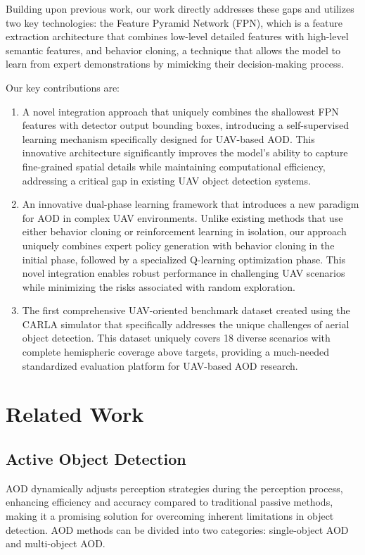 \documentclass[lettersize,journal]{IEEEtran}
\begin{document}
Building upon previous work, our work directly addresses these gaps and utilizes two key technologies: the Feature Pyramid Network (FPN), which is a feature extraction architecture that combines low-level detailed features with high-level semantic features, and behavior cloning, a technique that allows the model to learn from expert demonstrations by mimicking their decision-making process. 

Our key contributions are:
\begin{enumerate}
\item{A novel integration approach that uniquely combines the shallowest FPN features with detector output bounding boxes, introducing a self-supervised learning mechanism specifically designed for UAV-based AOD. This innovative architecture significantly improves the model's ability to capture fine-grained spatial details while maintaining computational efficiency, addressing a critical gap in existing UAV object detection systems.}
\item{An innovative dual-phase learning framework that introduces a new paradigm for AOD in complex UAV environments. Unlike existing methods that use either behavior cloning \cite{behavior2023} or reinforcement learning \cite{dataset2017, active2019,novel2021, active2022,enhancing2021,selfsupervised2022,dynamic2021} in isolation, our approach uniquely combines expert policy generation with behavior cloning in the initial phase, followed by a specialized Q-learning optimization phase. This novel integration enables robust performance in challenging UAV scenarios while minimizing the risks associated with random exploration.}
\item{The first comprehensive UAV-oriented benchmark dataset created using the CARLA simulator \cite{carla2017} that specifically addresses the unique challenges of aerial object detection. This dataset uniquely covers 18 diverse scenarios with complete hemispheric coverage above targets, providing a much-needed standardized evaluation platform for UAV-based AOD research.}
\end{enumerate}




\section{Related Work}

\subsection{Active Object Detection}
AOD dynamically adjusts perception strategies during the perception process, enhancing efficiency and accuracy compared to traditional passive methods, making it a promising solution for overcoming inherent limitations in object detection. AOD methods can be divided into two categories: single-object AOD and multi-object AOD.
\end{document}
